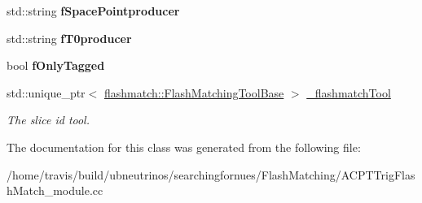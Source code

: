 \begin{DoxyCompactItemize}
\item 
std\+::string {\bfseries f\+Space\+Pointproducer}\hypertarget{classACPTTrigFlashMatch_a37a8ef70c53d0d0e2dd4df71b92ed967}{}\label{classACPTTrigFlashMatch_a37a8ef70c53d0d0e2dd4df71b92ed967}

\item 
std\+::string {\bfseries f\+T0producer}\hypertarget{classACPTTrigFlashMatch_a5c9298a02f961ee72ce941670365c7e7}{}\label{classACPTTrigFlashMatch_a5c9298a02f961ee72ce941670365c7e7}

\item 
bool {\bfseries f\+Only\+Tagged}\hypertarget{classACPTTrigFlashMatch_ab870ea0c1f870ff9c2077e466188951e}{}\label{classACPTTrigFlashMatch_ab870ea0c1f870ff9c2077e466188951e}

\item 
std\+::unique\+\_\+ptr$<$ \hyperlink{classflashmatch_1_1FlashMatchingToolBase}{flashmatch\+::\+Flash\+Matching\+Tool\+Base} $>$ \hyperlink{classACPTTrigFlashMatch_a12e3a8369411bc0e4608ec08d2cb56c5}{\+\_\+flashmatch\+Tool}\hypertarget{classACPTTrigFlashMatch_a12e3a8369411bc0e4608ec08d2cb56c5}{}\label{classACPTTrigFlashMatch_a12e3a8369411bc0e4608ec08d2cb56c5}

\begin{DoxyCompactList}\small\item\em The slice id tool. \end{DoxyCompactList}\end{DoxyCompactItemize}


The documentation for this class was generated from the following file\+:\begin{DoxyCompactItemize}
\item 
/home/travis/build/ubneutrinos/searchingfornues/\+Flash\+Matching/A\+C\+P\+T\+Trig\+Flash\+Match\+\_\+module.\+cc\end{DoxyCompactItemize}
